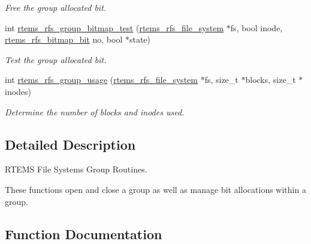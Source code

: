 \begin{DoxyCompactItemize}
\begin{DoxyCompactList}\small\item\em Free the group allocated bit. \end{DoxyCompactList}\item 
int \mbox{\hyperlink{rtems-rfs-group_8c_a5d4dab0178595df6610b29601dd67a01}{rtems\+\_\+rfs\+\_\+group\+\_\+bitmap\+\_\+test}} (\mbox{\hyperlink{struct__rtems__rfs__file__system}{rtems\+\_\+rfs\+\_\+file\+\_\+system}} $\ast$fs, bool inode, \mbox{\hyperlink{rtems-rfs-bitmaps_8h_acc1b0aefe1b090890ccbc1b05279a78e}{rtems\+\_\+rfs\+\_\+bitmap\+\_\+bit}} no, bool $\ast$state)
\begin{DoxyCompactList}\small\item\em Test the group allocated bit. \end{DoxyCompactList}\item 
int \mbox{\hyperlink{rtems-rfs-group_8c_a6f33253a6d629c7c2300b82fb21c4558}{rtems\+\_\+rfs\+\_\+group\+\_\+usage}} (\mbox{\hyperlink{struct__rtems__rfs__file__system}{rtems\+\_\+rfs\+\_\+file\+\_\+system}} $\ast$fs, size\+\_\+t $\ast$blocks, size\+\_\+t $\ast$inodes)
\begin{DoxyCompactList}\small\item\em Determine the number of blocks and inodes used. \end{DoxyCompactList}\end{DoxyCompactItemize}


\subsection{Detailed Description}
R\+T\+E\+MS File Systems Group Routines. 

These functions open and close a group as well as manage bit allocations within a group. 

\subsection{Function Documentation}
\mbox{\label{rtems-rfs-group_8c_a41c38f1d939cf04cad27dde05f52c394}} 

